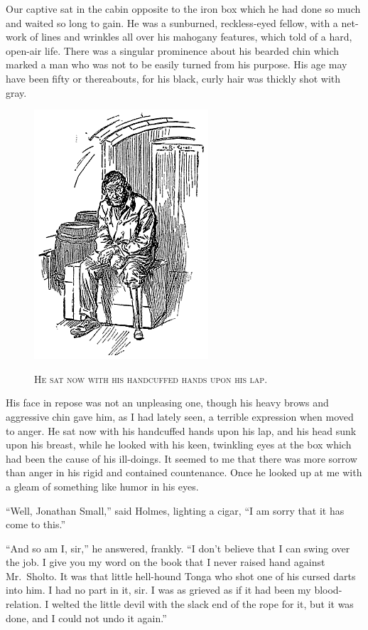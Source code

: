 \documentclass[12pt,english,oneside]{book}
\newcommand{\noun}[1]{\textsc{#1}}
\begin{document}
Our captive sat in the cabin opposite to the iron box which he had
done so much and waited so long to gain. He was a sunburned, reckless-eyed
fellow, with a net-work of lines and wrinkles all over his mahogany
features, which told of a hard, open-air life. There was a singular
prominence about his bearded chin which marked a man who was not to
be easily turned from his purpose. His age may have been fifty or
thereabouts, for his black, curly hair was thickly shot with gray.
%
\begin{figure}[htbp]
\noindent \begin{center}\includegraphics{images/sign410-sign-18.png}\end{center}

\noindent \begin{center}\noun{He sat now with his handcuffed hands
upon his lap.}\end{center}
\end{figure}
His face in repose was not an unpleasing one, though his heavy brows
and aggressive chin gave him, as I had lately seen, a terrible expression
when moved to anger. He sat now with his handcuffed hands upon his
lap, and his head sunk upon his breast, while he looked with his keen,
twinkling eyes at the box which had been the cause of his ill-doings.
It seemed to me that there was more sorrow than anger in his rigid
and contained countenance. Once he looked up at me with a gleam of
something like humor in his eyes.

{}``Well, Jonathan Small,'' said Holmes, lighting a cigar, {}``I
am sorry that it has come to this.''

{}``And so am I, sir,'' he answered, frankly. {}``I don't believe
that I can swing over the job. I give you my word on the book that
I never raised hand against Mr.\ Sholto. It was that little hell-hound
Tonga who shot one of his cursed darts into him. I had no part in
it, sir. I was as grieved as if it had been my blood-relation. I welted
the little devil with the slack end of the rope for it, but it was
done, and I could not undo it again.''
\end{document}
